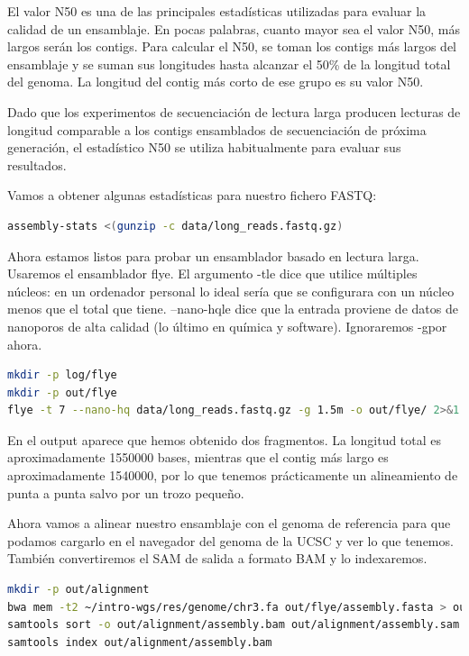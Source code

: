 El valor N50 es una de las principales estadísticas utilizadas para evaluar la calidad de un ensamblaje. En pocas palabras, cuanto mayor sea el valor N50, más largos serán los contigs.
Para calcular el N50, se toman los contigs más largos del ensamblaje y se suman sus longitudes hasta alcanzar el 50\% de la longitud total del genoma. La longitud del contig más corto de ese grupo es su valor N50.

Dado que los experimentos de secuenciación de lectura larga producen lecturas de longitud comparable a los contigs ensamblados de secuenciación de próxima generación, el estadístico N50 se utiliza habitualmente para evaluar sus resultados.

Vamos a obtener algunas estadísticas para nuestro fichero FASTQ:
\begin{lstlisting}[language=bash]
assembly-stats <(gunzip -c data/long_reads.fastq.gz)
\end{lstlisting}

Ahora estamos listos para probar un ensamblador basado en lectura larga.
Usaremos el ensamblador flye. El argumento -tle dice que utilice múltiples núcleos: en un ordenador personal lo ideal sería que se configurara con un núcleo menos que el total que tiene. --nano-hqle dice que la entrada proviene de datos de nanoporos de alta calidad (lo último en química y software). Ignoraremos -gpor ahora.
\begin{lstlisting}[language=bash]
mkdir -p log/flye
mkdir -p out/flye
flye -t 7 --nano-hq data/long_reads.fastq.gz -g 1.5m -o out/flye/ 2>&1 | tee log/flye/assembly.log
\end{lstlisting}
En el output aparece que hemos obtenido dos fragmentos. La longitud total es aproximadamente 1550000 bases, mientras que el contig más largo es aproximadamente 1540000, por lo que tenemos prácticamente un alineamiento de punta a punta salvo por un trozo pequeño. 

Ahora vamos a alinear nuestro ensamblaje con el genoma de referencia para que podamos cargarlo en el navegador del genoma de la UCSC y ver lo que tenemos. También convertiremos el SAM de salida a formato BAM y lo indexaremos.
\begin{lstlisting}[language=bash]
mkdir -p out/alignment
bwa mem -t2 ~/intro-wgs/res/genome/chr3.fa out/flye/assembly.fasta > out/alignment/assembly.sam
samtools sort -o out/alignment/assembly.bam out/alignment/assembly.sam
samtools index out/alignment/assembly.bam
\end{lstlisting}

